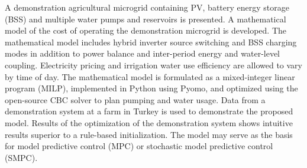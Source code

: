A demonstration agricultural microgrid containing PV, battery energy storage (BSS) and multiple water pumps and reservoirs is presented.
A mathematical model of the cost of operating the demonstration microgrid is developed.
The mathematical model includes hybrid inverter source switching and BSS charging modes in addition to power balance and inter-period energy and water-level coupling.
Electricity pricing and irrigation water use efficiency are allowed to vary by time of day.
The mathematical model is formulated as a mixed-integer linear program (MILP),
implemented in Python using Pyomo, and optimized using the open-source CBC solver to plan pumping and water usage.
Data from a demonstration system at a farm in Turkey is used to demonstrate the proposed model.
Results of the optimization of the demonstration system shows intuitive results superior to a rule-based initialization.
The model may serve as the basis for model predictive control (MPC) or stochastic model predictive control (SMPC).